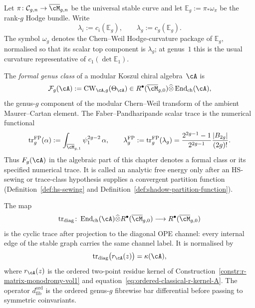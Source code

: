 \begin{definition}
\label{def:formal-genus-class-hodge-normalization}
Let $\pi\colon \mathcal C_{g,n}\to\overline{\cM}_{g,n}$ be the
universal stable curve and let
$\mathbb E_g:=\pi_*\omega_\pi$ be the rank-$g$ Hodge bundle.  Write
\[
\lambda_i:=c_i(\mathbb E_g),
\qquad
\lambda_g:=c_g(\mathbb E_g).
\]
The symbol $\omega_g$ denotes the Chern--Weil Hodge-curvature package of
$\mathbb E_g$, normalised so that its scalar top component is
$\lambda_g$; at genus~$1$ this is the usual curvature representative of
$c_1(\det\mathbb E_1)$.

The \emph{formal genus class} of a modular Koszul chiral algebra~$\cA$
is
\[
\mathcal F_g(\cA)
:=\operatorname{CW}_{\cA,g}(\Theta_\cA)
\in R^\bullet(\overline{\cM}_{g,0})\widehat\otimes
\operatorname{End}_{\mathrm{ch}}(\cA),
\]
the genus-$g$ component of the modular Chern--Weil transform of the
ambient Maurer--Cartan element.  The Faber--Pandharipande scalar trace is
the numerical functional
\[
\operatorname{tr}^{\mathrm{FP}}_g(\alpha)
:=\int_{\overline{\cM}_{g,1}}\psi_1^{2g-2}\,\alpha,
\qquad
\lambda_g^{\mathrm{FP}}
:=\operatorname{tr}^{\mathrm{FP}}_g(\lambda_g)
=
\frac{2^{2g-1}-1}{2^{2g-1}}\frac{|B_{2g}|}{(2g)!}.
\]
Thus $F_g(\cA)$ in the algebraic part of this chapter denotes a formal
class or its specified numerical trace.  It is called an analytic free
energy only after an HS-sewing or trace-class hypothesis supplies a
convergent partition function
\textup{(}Definition~\ref{def:hs-sewing} and
Definition~\ref{def:shadow-partition-function}\textup{)}.
\end{definition}

\begin{definition}
\label{def:diagonal-trace-ordered-curvature}
The map
\[
\operatorname{tr}_{\mathrm{diag}}\colon
\operatorname{End}_{\mathrm{ch}}(\cA)\widehat\otimes
R^\bullet(\overline{\cM}_{g,0})
\longrightarrow
R^\bullet(\overline{\cM}_{g,0})
\]
is the cyclic trace after projection to the diagonal OPE channel: every
internal edge of the stable graph carries the same channel label.  It is
normalised by
\[
\operatorname{tr}_{\mathrm{diag}}\bigl(r_\cA(z)\bigr)=\kappa(\cA),
\]
where $r_\cA(z)$ is the ordered two-point residue kernel of
Construction~\ref{constr:r-matrix-monodromy-vol1} and
equation~\ref{eq:ordered-classical-r-kernel-A}.  The operator
$d_{\mathrm{fib}}^{\mathrm{ord}}$ is the ordered genus-$g$ fibrewise bar
differential before passing to symmetric coinvariants.
\end{definition}

